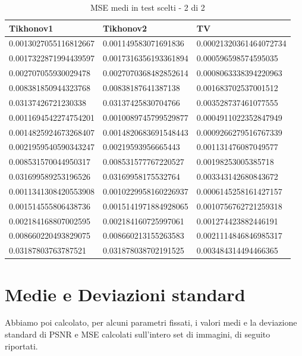 \documentclass[12pt]{article}
\begin{document}
    \begin{table}[!ht]
    \centering
    \begin{tabular}{|l|l|l|}
    \hline
        Tikhonov1 & Tikhonov2 & TV \\ \hline
        0.0013027055116812667 & 0.001149583071691836 & 0.00021320361464072734 \\ \hline
        0.0017322871994439597 & 0.0017316356193361894 & 0.000596598574595035 \\ \hline
        0.002707055930029478 & 0.0027070368482852614 & 0.0008063338394220963 \\ \hline
        0.008381850944323768 & 0.00838187641387138 & 0.001683702537001512 \\ \hline
        0.03137426721230338 & 0.03137425830704766 & 0.003528737461077555 \\ \hline
        0.0011694542274754201 & 0.0010089745799529877 & 0.0004911022352847949 \\ \hline
        0.0014825924673268407 & 0.0014820683691548443 & 0.0009266279516767339 \\ \hline
        0.0021959540590343247 & 0.00219593956665443 & 0.001131476087049577 \\ \hline
        0.008531570044950317 & 0.008531577767220527 & 0.00198253005385718 \\ \hline
        0.031699589253196526 & 0.03169958175532764 & 0.003343142680843672 \\ \hline
        0.0011341308420553908 & 0.0010229958160226937 & 0.0006145258161427157 \\ \hline
        0.001514555806438736 & 0.0015141971884928065 & 0.0010756762721259318 \\ \hline
        0.002184168807002595 & 0.002184160725997061 & 0.001274423882446191 \\ \hline
        0.008660220493829075 & 0.008660213155263583 & 0.0021114846846985317 \\ \hline
        0.03187803763787521 & 0.031878038702191525 & 0.003484314494466365 \\ \hline
    \end{tabular}
    \caption{MSE medi in test scelti - 2 di 2}
    \label{table:5}
    \end{table}
    \newpage

\section{Medie e Deviazioni standard}
    Abbiamo poi calcolato, per alcuni parametri fissati, i valori medi e la deviazione standard di PSNR e MSE calcolati sull'intero set di immagini, di seguito riportati.
\end{document}
